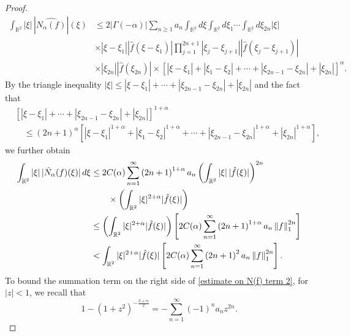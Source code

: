 \documentclass[reqno]{amsart}%
\theoremstyle{definition}
\theoremstyle{remark}
\numberwithin{equation}{section}
\newcommand{\0}{\mathbf{0}}
\newcommand{\1}{\mathbf{1}}
\numberwithin{equation}{section}
\numberwithin{theorem}{section}
\numberwithin{figure}{section}
\begin{document}
{\begin{proof}
\begin{equation}
\begin{aligned}
\int_{\mathbb{R}^{2}} |\xi| \, |\widehat{N_{\alpha}(f)}|(\xi) &\leq 2 \left| {\Gamma}(-\alpha) \right|  \sum_{n\geq1}  a_n \int_{\mathbb{R}^2} d\xi \int_{\mathbb{R}^2} d\xi_1 \cdots \int_{\mathbb{R}^2}  d\xi_{2n}|\xi|\\
& \times \left|\xi-\xi_{1} \right| \left| \hat{f}(\xi  - \xi_{1} )  \right|   \prod_{j=1}^{2n+1} \left| \xi_{j} - \xi_{j+1} \right| \left| \hat{f}(\xi_{j} - \xi_{j+1} )  \right| \\
& \times\left| \xi_{2n} \right|  \left| \hat{f}(\xi_{2n})\right| \times   \left[ \left| \xi - \xi_1 \right| + \left|\xi_1 - \xi_2\right| + \cdots + \left| \xi_{2n-1} - \xi_{2n} \right| +\left|\xi_{2n} \right| \right]^\alpha.
\end{aligned}
\end{equation}
By the triangle inequality $|\xi| \leq |\xi - \xi_1| + \cdots + |\xi_{2n-1} - \xi_{2n}| + |\xi_{2n}|$ and the fact that
\begin{equation}\nonumber
\begin{aligned}
&\left[ |\xi - \xi_1| + \cdots + |\xi_{2n-1} - \xi_{2n}| + |\xi_{2n}| \right]^{1+\alpha}\\
& \quad \leq (2n+1)^{\alpha} \left[ \left|\xi - \xi_1\right|^{1+\alpha} + \left|\xi_1 - \xi_2\right|^{1+\alpha} + \cdots + \left|\xi_{2n-1} - \xi_{2n}\right|^{1+\alpha} + \left|\xi_{2n}\right|^{1+\alpha} \right],
\end{aligned}
\end{equation}
we further obtain
\begin{align}\label{estimate on N(f) term 2}
\int_{\mathbb{R}^2} |\xi| \, |\hat{N}_\alpha (f)(\xi)| \, d\xi &\leq 2 C(\alpha) \sum_{n=1}^{\infty}    \left( 2n+1 \right)^{1+\alpha}  a_{n} \left( \int_{\mathbb{R}^2} |\xi| \, |\hat{f}(\xi)| \right)^{2n}\notag\\
&\qquad \times \left( \int_{\mathbb{R}^2} |\xi|^{2+\alpha} |\hat{f}(\xi)| \right) \notag\\
&\leq \left( \int_{\mathbb{R}^2} |\xi|^{2+\alpha} |\hat{f}(\xi)| \right) \left[ 2 C(\alpha) \sum_{n=1}^{\infty}   \left( 2n+1 \right)^{1+\alpha} a_n  \left\| {f}\right\|_{1}^{2n} \right] \notag\\
&< \int_{\mathbb{R}^2} |\xi|^{2+\alpha} |\hat{f}(\xi)| \left[ 2 C(\alpha) \sum_{n=1}^{\infty}   \left( 2n+1 \right)^{2}a_n  \left\| {f}\right\|_{1}^{2n} \right].
\end{align}
To bound the summation term on the right side of \eqref{estimate on N(f) term 2}, for $|z|<1$, we recall that $$1-(1+z^{2})^{-\frac{3+\alpha}{2}} =- \sum_{n=1}^{\infty}  (-1)^n a_n  z^{2n}.$$

\end{proof}}
\end{document}
